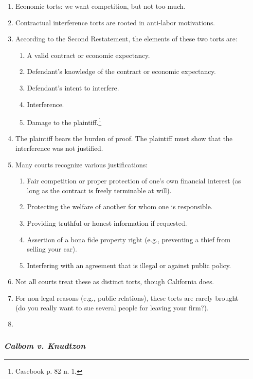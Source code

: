 \begin{enumerate}
    \item Economic torts: we want competition, but not too much.
    \item Contractual interference torts are rooted in anti-labor motivations.
    \item According to the Second Restatement, the elements of these two torts 
    are:
    \begin{enumerate}
        \item A valid contract or economic expectancy.
        \item Defendant's knowledge of the contract or economic expectancy.
        \item Defendant's intent to interfere.
        \item Interference.
        \item Damage to the plaintiff.\footnote{Casebook p. 82 n. 1.}
    \end{enumerate}
    \item The plaintiff bears the burden of proof. The plaintiff must show 
    that the interference was not justified.
    \item Many courts recognize various justifications:
    \begin{enumerate}
        \item Fair competition or proper protection of one's own financial 
        interest (as long as the contract is freely terminable at will).
        \item Protecting the welfare of another for whom one is responsible.
        \item Providing truthful or honest information if requested.
        \item Assertion of a bona fide property right (e.g., preventing a 
        thief from selling your car).
        \item Interfering with an agreement that is illegal or against public 
        policy.
    \end{enumerate}
    \item Not all courts treat these as distinct torts, though California 
    does.
    \item For non-legal reasons (e.g., public relations), these torts are 
    rarely brought (do you really want to sue several people for leaving your 
    firm?).
    \item 
\end{enumerate}

\subsubsection{\emph{Calbom v. Knudtzon}}

